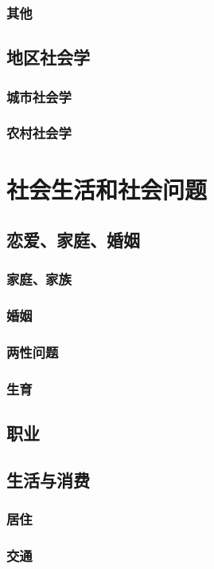 \documentclass[UTF8]{../RepresentationUniverse}
\begin{document}
        \subsubsection{其他}
    \subsection{地区社会学}
        \subsubsection{城市社会学}
        \subsubsection{农村社会学}
\section{社会生活和社会问题}
    \subsection{恋爱、家庭、婚姻}
        \subsubsection{家庭、家族}
        \subsubsection{婚姻}
        \subsubsection{两性问题}
        \subsubsection{生育}
    \subsection{职业}
    \subsection{生活与消费}
        \subsubsection{居住}
        \subsubsection{交通}
\end{document}
